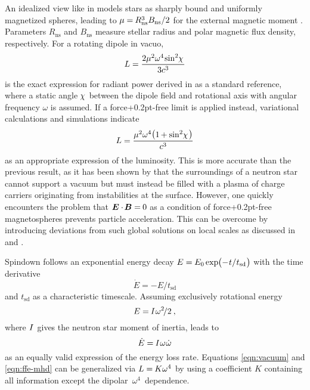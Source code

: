 An idealized view like in \cite{Deutsch_1955} models stars as sharply bound and uniformly magnetized spheres, leading to
$\cramped{\mu \kern-0.1pt = \kern-0.6pt R_\text{ns}^3 B_\text{ns} \kern+0.1pt / 2}$ for the external magnetic moment \cite{Jackson_1999}.
Parameters $R_\text{ns}$ and $B_\text{ns}$ measure stellar radius and polar magnetic flux density, respectively. For a rotating
dipole in vacuo,
\begin{equation}
	L = \frac{2\mu^2 \omega^4 \kern-1.0pt \sin^2 \kern-2.0pt \chi \kern+1.0pt}{3c^3}
	\label{eqn:vacuum}
\end{equation}
is the exact expression for radiant power derived in \cite{Jackson_1999} as a standard reference, where a static angle
$\kern-1.0pt \chi \kern+1.0pt$ between the dipole field and rotational axis with angular frequency $\omega$ is assumed. If
a force{\kern+0.2pt}-free limit is applied instead, variational calculations \cite{Gruzinov_2006} and simulations
\cite{Spitkovsky_2006} indicate
\begin{equation}
	L = \frac{\mu^2 \omega^4 \raisebox{0.15ex}{\( \bigl(
	\raisebox{-0.15ex}{\( 1 \kern-0.7pt + \sin^2 \kern-2.0pt \chi \kern+1.0pt \)} \bigr) \)} }{c^3}
	\label{eqn:ffe-mhd}
\end{equation}
as an appropriate expression of the luminosity. This is more accurate than the previous result, as it has been
shown by \cite{Goldreich_1969} that the surroundings of a neutron star cannot support a vacuum but must instead be filled
with a plasma of charge carriers originating from instabilities at the surface. However, one quickly encounters the problem that
$\bm{E} \cdot \kern-1.0pt \bm{B} = \kern-0.5pt 0$ as a condition of force{\kern+0.2pt}-free magnetospheres prevents particle acceleration.
This can be overcome by introducing deviations from such global solutions on local scales as discussed in \cite{Li_2012} and \cite{Gralla_2019}.

Spindown follows an exponential energy decay $E = \kern-0.3pt E_0 \kern-0.2pt \exp \kern-2.0pt
\smash{\bigl( - \kern+0.5pt t \kern+0.1pt / \kern+0.2pt t_\text{sd} \kern+0.5pt \bigr)}$ with the time derivative
\begin{equation}
	\dot{E} = - E / t_\text{sd}
	\label{eqn:exp-derivative}
\end{equation}
and $t_\text{sd}$ as a characteristic timescale. Assuming exclusively rotational energy
\begin{equation}
	E = \kern-0.5pt I \kern+0.5pt \omega^2 \kern-1.5pt / 2 \: ,
	\label{eqn:quad}
\end{equation}
where $I \kern+0.5pt$ gives the neutron star moment of inertia, leads to
\begin{equation}
	\dot{E} = \kern-0.5pt I \kern+0.5pt \omega \kern+0.5pt \dot{\omega}
	\label{eqn:quad-derivative}
\end{equation}
as an equally valid expression of the energy loss rate. Equations \eqref{eqn:vacuum} and \eqref{eqn:ffe-mhd} can be generalized via
$L = \kern-0.5pt K \omega^4$ by using a coefficient $K$ containing all information except the \mbox{dipolar $\omega^4$ dependence.}

